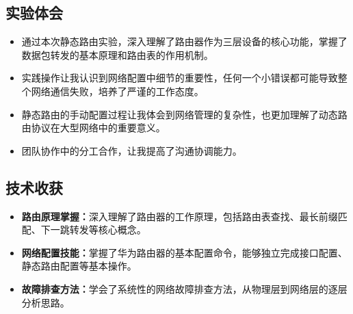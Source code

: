 \documentclass[a4paper]{article}
\begin{document}
\subsection{实验体会}
\begin{itemize}
    \item 通过本次静态路由实验，深入理解了路由器作为三层设备的核心功能，掌握了数据包转发的基本原理和路由表的作用机制。
    \item 实践操作让我认识到网络配置中细节的重要性，任何一个小错误都可能导致整个网络通信失败，培养了严谨的工作态度。
    \item 静态路由的手动配置过程让我体会到网络管理的复杂性，也更加理解了动态路由协议在大型网络中的重要意义。
    \item 团队协作中的分工合作，让我提高了沟通协调能力。
\end{itemize}

\subsection{技术收获}
\begin{itemize}
    \item \textbf{路由原理掌握：}深入理解了路由器的工作原理，包括路由表查找、最长前缀匹配、下一跳转发等核心概念。
    \item \textbf{网络配置技能：}掌握了华为路由器的基本配置命令，能够独立完成接口配置、静态路由配置等基本操作。
    \item \textbf{故障排查方法：}学会了系统性的网络故障排查方法，从物理层到网络层的逐层分析思路。
\end{itemize}
\end{document}
